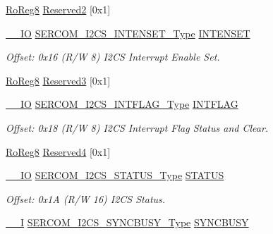 \begin{DoxyCompactItemize}
\mbox{\hyperlink{group___s_a_m_d21_e15_a__definitions_ga0d957f1433aaf5d70e4dc2b68288442d}{Ro\+Reg8}} \mbox{\hyperlink{struct_sercom_i2cs_a99ee50bfa44e107c16a546d778dcdcc7}{Reserved2}} \mbox{[}0x1\mbox{]}
\item 
\mbox{\hyperlink{core__cm0plus_8h_aec43007d9998a0a0e01faede4133d6be}{\+\_\+\+\_\+\+IO}} \mbox{\hyperlink{union_s_e_r_c_o_m___i2_c_s___i_n_t_e_n_s_e_t___type}{S\+E\+R\+C\+O\+M\+\_\+\+I2\+C\+S\+\_\+\+I\+N\+T\+E\+N\+S\+E\+T\+\_\+\+Type}} \mbox{\hyperlink{struct_sercom_i2cs_a3e1d1378b663717dd882f5ba9ba45788}{I\+N\+T\+E\+N\+S\+ET}}
\begin{DoxyCompactList}\small\item\em Offset\+: 0x16 (R/W 8) I2\+CS Interrupt Enable Set. \end{DoxyCompactList}\item 
\mbox{\hyperlink{group___s_a_m_d21_e15_a__definitions_ga0d957f1433aaf5d70e4dc2b68288442d}{Ro\+Reg8}} \mbox{\hyperlink{struct_sercom_i2cs_ae12c3e940f27988a085afebe2f779a21}{Reserved3}} \mbox{[}0x1\mbox{]}
\item 
\mbox{\hyperlink{core__cm0plus_8h_aec43007d9998a0a0e01faede4133d6be}{\+\_\+\+\_\+\+IO}} \mbox{\hyperlink{union_s_e_r_c_o_m___i2_c_s___i_n_t_f_l_a_g___type}{S\+E\+R\+C\+O\+M\+\_\+\+I2\+C\+S\+\_\+\+I\+N\+T\+F\+L\+A\+G\+\_\+\+Type}} \mbox{\hyperlink{struct_sercom_i2cs_a1b4aaca7510295245ee669312561f4d8}{I\+N\+T\+F\+L\+AG}}
\begin{DoxyCompactList}\small\item\em Offset\+: 0x18 (R/W 8) I2\+CS Interrupt Flag Status and Clear. \end{DoxyCompactList}\item 
\mbox{\hyperlink{group___s_a_m_d21_e15_a__definitions_ga0d957f1433aaf5d70e4dc2b68288442d}{Ro\+Reg8}} \mbox{\hyperlink{struct_sercom_i2cs_a5ca570382e961b7801aeafc161de2571}{Reserved4}} \mbox{[}0x1\mbox{]}
\item 
\mbox{\hyperlink{core__cm0plus_8h_aec43007d9998a0a0e01faede4133d6be}{\+\_\+\+\_\+\+IO}} \mbox{\hyperlink{union_s_e_r_c_o_m___i2_c_s___s_t_a_t_u_s___type}{S\+E\+R\+C\+O\+M\+\_\+\+I2\+C\+S\+\_\+\+S\+T\+A\+T\+U\+S\+\_\+\+Type}} \mbox{\hyperlink{struct_sercom_i2cs_a79a5db5b9d6d22550c597a60aa286330}{S\+T\+A\+T\+US}}
\begin{DoxyCompactList}\small\item\em Offset\+: 0x1A (R/W 16) I2\+CS Status. \end{DoxyCompactList}\item 
\mbox{\hyperlink{core__cm0plus_8h_af63697ed9952cc71e1225efe205f6cd3}{\+\_\+\+\_\+I}} \mbox{\hyperlink{union_s_e_r_c_o_m___i2_c_s___s_y_n_c_b_u_s_y___type}{S\+E\+R\+C\+O\+M\+\_\+\+I2\+C\+S\+\_\+\+S\+Y\+N\+C\+B\+U\+S\+Y\+\_\+\+Type}} \mbox{\hyperlink{struct_sercom_i2cs_a80db8bcc49375996ab811cf9d8b89664}{S\+Y\+N\+C\+B\+U\+SY}}

\end{DoxyCompactItemize}
